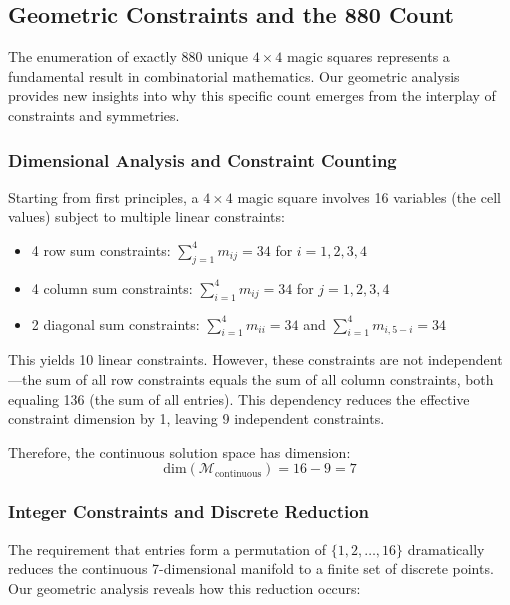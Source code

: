 \subsection{Geometric Constraints and the 880 Count}\label{sec:enumeration}

The enumeration of exactly 880 unique $4 \times 4$ magic squares represents a fundamental result in combinatorial mathematics. Our geometric analysis provides new insights into why this specific count emerges from the interplay of constraints and symmetries.

\subsubsection{Dimensional Analysis and Constraint Counting}

Starting from first principles, a $4 \times 4$ magic square involves 16 variables (the cell values) subject to multiple linear constraints:
\begin{itemize}
    \item 4 row sum constraints: $\sum_{j=1}^4 m_{ij} = 34$ for $i = 1, 2, 3, 4$
    \item 4 column sum constraints: $\sum_{i=1}^4 m_{ij} = 34$ for $j = 1, 2, 3, 4$
    \item 2 diagonal sum constraints: $\sum_{i=1}^4 m_{ii} = 34$ and $\sum_{i=1}^4 m_{i,5-i} = 34$
\end{itemize}

This yields 10 linear constraints. However, these constraints are not independent—the sum of all row constraints equals the sum of all column constraints, both equaling 136 (the sum of all entries). This dependency reduces the effective constraint dimension by 1, leaving 9 independent constraints.

Therefore, the continuous solution space has dimension:
\begin{equation}
\text{dim}(\mathcal{M}_{\text{continuous}}) = 16 - 9 = 7
\end{equation}

\subsubsection{Integer Constraints and Discrete Reduction}

The requirement that entries form a permutation of $\{1, 2, \ldots, 16\}$ dramatically reduces the continuous 7-dimensional manifold to a finite set of discrete points. Our geometric analysis reveals how this reduction occurs:

